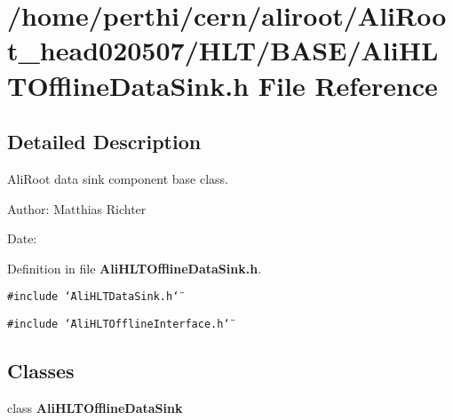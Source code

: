 \section{/home/perthi/cern/aliroot/Ali\-Root\_\-head020507/HLT/BASE/Ali\-HLTOffline\-Data\-Sink.h File Reference}
\label{AliHLTOfflineDataSink_8h}


\subsection{Detailed Description}
Ali\-Root data sink component base class. 

\begin{Desc}
\item[Author:]Matthias Richter \end{Desc}
\begin{Desc}
\item[Date:]\end{Desc}


Definition in file {\bf Ali\-HLTOffline\-Data\-Sink.h}.

{\tt \#include \char`\"{}Ali\-HLTData\-Sink.h\char`\"{}}\par
{\tt \#include \char`\"{}Ali\-HLTOffline\-Interface.h\char`\"{}}\par
\subsection*{Classes}
\begin{CompactItemize}
\item 
class {\bf Ali\-HLTOffline\-Data\-Sink}
\end{CompactItemize}
